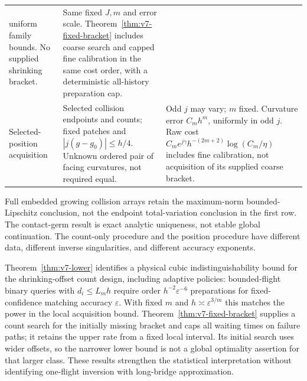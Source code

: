 \begin{longtable}{@{}p{}p{}p{}@{}}
uniform family bounds. No supplied shrinking bracket. & Same fixed
$J,m$ and error scale. Theorem~\ref{thm:v7-fixed-bracket} includes
coarse search and capped fine calibration in the same cost order,
with a deterministic all-history preparation cap.\\[3pt]
Selected-position acquisition & Selected collision endpoints and
counts; fixed patches and $|j(g-g_0)|\le h/4$. Unknown ordered pair
of facing curvatures, not required equal. & Odd $j$ may vary; $m$ fixed.
Curvature error $C_mh^m$, uniformly in odd $j$. Raw cost
$C_me^{j\gamma}h^{-(2m+2)}\log(C_m/\eta)$ includes fine calibration,
not acquisition of its supplied coarse bracket.\\
\bottomrule
\end{longtable}
\endgroup

Full embedded growing collision arrays retain the maximum-norm
bounded-Lipschitz conclusion, not the endpoint total-variation
conclusion in the first row. The contact-germ result is exact analytic
uniqueness, not stable global continuation. The count-only procedure
and the position procedure have different data, different inverse
singularities, and different accuracy exponents.

Theorem~\ref{thm:v7-lower} identifies a physical cubic
indistinguishability bound for the shrinking-offset count design,
including adaptive policies: bounded-flight binary queries with
$d_i\le L_mh$ require order $h^{-2}\varepsilon^{-6}$ preparations
for fixed-confidence matching accuracy $\varepsilon$. With fixed
$m$ and $h\asymp\varepsilon^{3/m}$ this matches the power in the
local acquisition bound. Theorem~\ref{thm:v7-fixed-bracket} supplies
a count search for the initially missing bracket and caps all waiting
times on failure paths; it retains the upper rate from a fixed local
interval. Its initial search uses wider offsets, so the narrower
lower bound is not a global optimality assertion for that larger
class. These results strengthen the statistical interpretation without
identifying one-flight inversion with long-bridge approximation.
